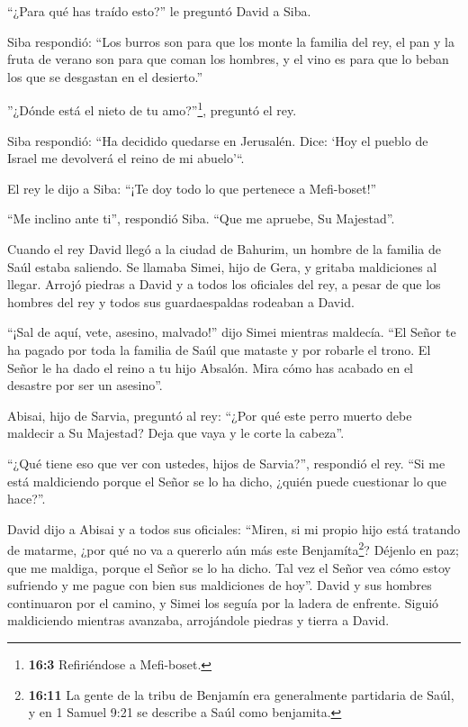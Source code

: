  ``¿Para qué has traído esto?'' le preguntó David a Siba.

Siba respondió: ``Los burros son para que los monte la familia del rey,
el pan y la fruta de verano son para que coman los hombres, y el vino es
para que lo beban los que se desgastan en el desierto.''

 ''¿Dónde está el nieto de tu amo?''\footnote{\textbf{16:3}
  Refiriéndose a Mefi-boset.}, preguntó el rey.

Siba respondió: ``Ha decidido quedarse en Jerusalén. Dice: `Hoy el
pueblo de Israel me devolverá el reino de mi abuelo'``.

 El rey le dijo a Siba: ``¡Te doy todo lo que pertenece a
Mefi-boset!''

``Me inclino ante ti'', respondió Siba. ``Que me apruebe, Su Majestad''.

 Cuando el rey David llegó a la ciudad de Bahurim, un hombre
de la familia de Saúl estaba saliendo. Se llamaba Simei, hijo de Gera, y
gritaba maldiciones al llegar.  Arrojó piedras a David y a
todos los oficiales del rey, a pesar de que los hombres del rey y todos
sus guardaespaldas rodeaban a David.

 ``¡Sal de aquí, vete, asesino, malvado!'' dijo Simei
mientras maldecía.  ``El Señor te ha pagado por toda la
familia de Saúl que mataste y por robarle el trono. El Señor le ha dado
el reino a tu hijo Absalón. Mira cómo has acabado en el desastre por ser
un asesino''.

 Abisai, hijo de Sarvia, preguntó al rey: ``¿Por qué este
perro muerto debe maldecir a Su Majestad? Deja que vaya y le corte la
cabeza''.

 ``¿Qué tiene eso que ver con ustedes, hijos de Sarvia?'',
respondió el rey. ``Si me está maldiciendo porque el Señor se lo ha
dicho, ¿quién puede cuestionar lo que hace?''.

 David dijo a Abisai y a todos sus oficiales: ``Miren, si
mi propio hijo está tratando de matarme, ¿por qué no va a quererlo aún
más este Benjamíta\footnote{\textbf{16:11} La gente de la tribu de
  Benjamín era generalmente partidaria de Saúl, y en 1 Samuel 9:21 se
  describe a Saúl como benjamita.}? Déjenlo en paz; que me maldiga,
porque el Señor se lo ha dicho.  Tal vez el Señor vea cómo
estoy sufriendo y me pague con bien sus maldiciones de hoy''.
 David y sus hombres continuaron por el camino, y Simei los
seguía por la ladera de enfrente. Siguió maldiciendo mientras avanzaba,
arrojándole piedras y tierra a David.

